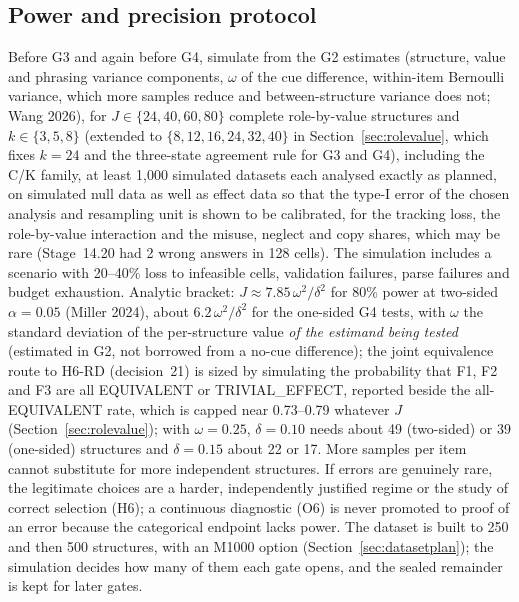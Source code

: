 \documentclass[10pt,a4paper]{article}
\begin{document}
\subsection{Power and precision protocol}
Before G3 and again before G4, simulate from the G2 estimates (structure, value and phrasing variance components,
$\omega$ of the cue difference, within-item Bernoulli variance, which more samples reduce and between-structure
variance does not; Wang 2026), for $J\in\{24,40,60,80\}$ complete role-by-value structures and
$k\in\{3,5,8\}$ (extended to $\{8,12,16,24,32,40\}$ in Section~\ref{sec:rolevalue}, which fixes $k=24$ and the three-state agreement rule for G3 and G4), including the C/K family, at least 1,000 simulated datasets each analysed exactly as planned, on simulated null data as well as effect data so
that the type-I error of the chosen analysis and resampling unit is shown to be calibrated, for the tracking loss, the role-by-value interaction
and the misuse, neglect and copy shares, which may be rare (Stage~14.20 had 2 wrong answers in 128 cells). The
simulation includes a scenario with 20--40\% loss to infeasible cells, validation failures, parse failures and
budget exhaustion. Analytic bracket: $J\approx7.85\,\omega^2/\delta^2$ for 80\% power at two-sided $\alpha=0.05$
(Miller 2024), about $6.2\,\omega^2/\delta^2$ for the one-sided G4 tests, with $\omega$ the standard deviation of the
per-structure value \emph{of the estimand being tested} (estimated in G2, not borrowed from a no-cue difference);
the joint equivalence route to H6-RD (decision~21) is sized by simulating the probability that F1, F2 and F3 are all EQUIVALENT or
TRIVIAL\_EFFECT, reported beside the all-EQUIVALENT rate, which is capped near 0.73--0.79 whatever $J$ (Section~\ref{sec:rolevalue});
with $\omega=0.25$, $\delta=0.10$ needs about 49 (two-sided) or 39 (one-sided) structures and $\delta=0.15$ about 22
or 17. More samples per item cannot
substitute for more independent structures. If errors are genuinely rare, the legitimate choices are a harder,
independently justified regime or the study of correct selection (H6); a continuous diagnostic (O6) is never
promoted to proof of an error because the categorical endpoint lacks power. The dataset is built to 250 and then 500
structures, with an M1000 option (Section~\ref{sec:datasetplan}); the simulation decides how many of them each gate opens, and the sealed
remainder is kept for later gates.
\end{document}
